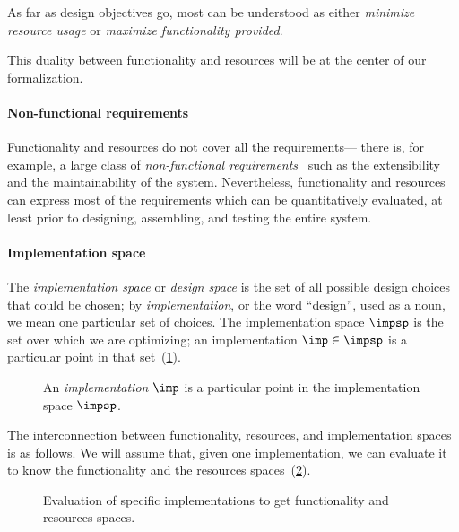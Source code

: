 As far as design objectives go, most can be understood as either \emph{minimize resource usage}
or \emph{maximize functionality provided}.

This duality between functionality and resources will be at the
center of our formalization.

\paragraph{Non-functional requirements}

Functionality and resources do not cover all the requirements--- there is, for example, a
large class of \emph{non-functional requirements}~\cite{deweck2011} such as the extensibility and the
maintainability of the system. Nevertheless, functionality and resources can express most of
the requirements which can be quantitatively evaluated, at least prior to designing, assembling,
and testing the entire system.

\paragraph{Implementation space}

The \emph{implementation space} or \textit{design space} is the set of all possible design choices that could be chosen; by \textit{implementation}, or the word ``design'', used as a noun, we mean one particular set of choices. The implementation space $\impsp$ is the set over which we are optimizing; an implementation $\imp\in\impsp$ is a particular point in that set~(\cref{fig:impspace}).

\begin{figure}[h!]
    \begin{center}
    \end{center}
    \caption{An \emph{implementation} $\imp$ is a particular point in the implementation space $\impsp$.}
    \label{fig:impspace}
\end{figure}


The interconnection between functionality, resources, and implementation spaces
is as follows. We will assume that, given one implementation, we can evaluate it
to know the functionality and the resources spaces~(\cref{fig:FIR}).

\begin{figure}[h!]
    \centering
    \caption{Evaluation of specific implementations to get functionality and resources spaces.\label{fig:FIR}}
\end{figure}

